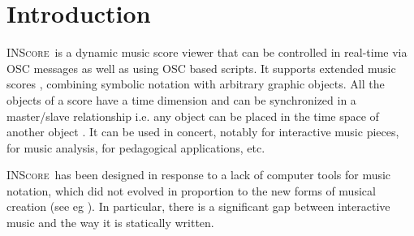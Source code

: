\documentclass{article}
\title{\papertitle}
\newcommand{\inscore}		{\textsc{\small INScore}}
\begin{document}
%
\capstartfalse
\maketitle
\capstarttrue
%
\begin{abstract}
\inscore\ is an environment for the design of interactive music scores that includes an original event-based interaction system and a scripting language for associating arbitrary messages to these events. We extended the previous version by supporting scripting languages offering a great flexibility in the description of scores and in the interactions with scores. The textual format is directly derived from the OSC message format that was defined in the original \inscore\ version. This article presents the scripting language and illustrates its ability to describe interactions based on events, while remaining in the temporal space. It also introduces the IRCAM gesture follower and how it is embedded into \inscore\ to provide gestural interaction capabilities.
\end{abstract}
%

\section{Introduction}\label{sec:introduction}
\inscore\ is a dynamic music score viewer that can be controlled in real-time via OSC messages as well as using OSC based scripts. It supports extended music scores \cite{Fober:10c}, combining symbolic notation with arbitrary graphic objects. All the objects of a score have a time dimension and can be synchronized in a master/slave relationship i.e. any object can be placed in the time space of another object \cite{Fober:10b}. 
It can be used in concert, notably for interactive music pieces, for music analysis, for pedagogical applications, etc.


\inscore\ has been designed in response to a lack of computer tools for music notation, which did not evolved in proportion to the new forms of musical creation (see eg \cite{magnuss11} \cite{freeman11}).
In particular, there is a significant gap between interactive music and the way it is statically written.
\end{document}
